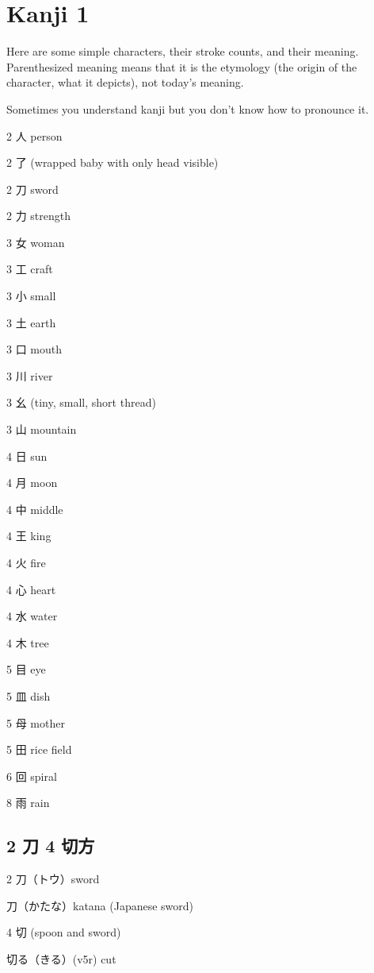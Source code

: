\chapter{Kanji 1}

Here are some simple characters, their stroke counts, and their meaning.
Parenthesized meaning means that it is the etymology
(the origin of the character, what it depicts),
not today's meaning.

Sometimes you understand kanji but you don't know how to pronounce it.

2 人 person\par
2 了 (wrapped baby with only head visible)\par
2 刀 sword\par
2 力 strength\par
3 女 woman\par
3 工 craft\par
3 小 small\par
3 土 earth\par
3 口 mouth\par
3 川 river\par
3 幺 (tiny, small, short thread)\par
3 山 mountain\par
4 日 sun\par
4 月 moon\par
4 中 middle\par
4 王 king\par
4 火 fire\par
4 心 heart\par
4 水 water\par
4 木 tree\par
5 目 eye\par
5 皿 dish\par
5 母 mother\par
5 田 rice field\par
6 回 spiral\par
8 雨 rain\par



\section{2 刀 4 切方}

2 刀（トウ）sword

刀（かたな）katana (Japanese sword)

4 切 (spoon and sword)

切る（きる）(v5r) cut

